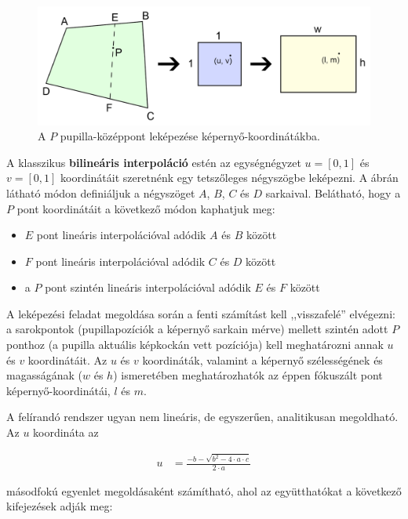 \bigskip

\begin{figure}[!ht]
\centering
\includegraphics[width=140mm, keepaspectratio]{figures/interpol.png}
\caption{A $P$ pupilla-középpont leképezése képernyő-koordinátákba.}
\label{fig:interpol}
\end{figure}

A klasszikus \textbf{bilineáris interpoláció} estén az egységnégyzet $u = [0, 1]$ és $v = [0, 1]$ koordinátáit szeretnénk egy tetszőleges négyszögbe leképezni. A  ábrán látható módon definiáljuk a négyszöget $A$, $B$, $C$ és $D$ sarkaival. Belátható, hogy a $P$ pont koordinátáit a következő módon kaphatjuk meg:

\begin{itemize}
  \item $E$ pont lineáris interpolációval adódik $A$ és $B$ között
  \item $F$ pont lineáris interpolációval adódik $C$ és $D$ között
  \item a $P$ pont szintén lineáris interpolációval adódik $E$ és $F$ között
\end{itemize}

A leképezési feladat megoldása során a fenti számítást kell ,,visszafelé'' elvégezni: a sarokpontok (pupillapozíciók a képernyő sarkain mérve) mellett szintén adott $P$ ponthoz (a pupilla aktuális képkockán vett pozíciója) kell meghatározni annak $u$ és $v$ koordinátáit. Az $u$ és $v$ koordináták, valamint a képernyő szélességének és magasságának ($w$ és $h$) ismeretében meghatározhatók az éppen fókuszált pont képernyő-koordinátái, $l$ és $m$.

A felírandó rendszer ugyan nem lineáris, de egyszerűen, analitikusan megoldható. Az $u$ koordináta az

\begin{align}\label{eq:calib_1}
u &= \frac{-b - \sqrt{b^2 - 4 \cdot a \cdot c}}{2 \cdot a}
\end{align}

másodfokú egyenlet megoldásaként számítható, ahol az együtthatókat a következő kifejezések adják meg:

